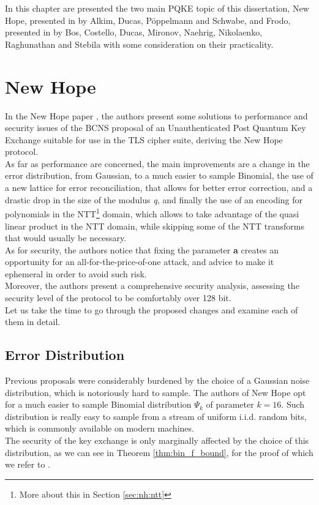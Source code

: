 In this chapter are presented the two main PQKE topic of this dissertation, New Hope, presented in \cite{newhope} by Alkim, Ducas, P{\"o}ppelmann and Schwabe, and Frodo, presented in \cite{frodo} by Bos, Costello, Ducas, Mironov, Naehrig, Nikolaenko, Raghunathan and Stebila with some consideration on their practicality.

\section{New Hope}
In the New Hope paper \cite{newhope}, the authors present some solutions to performance and security issues of the BCNS proposal \cite{BCNS} of an Unauthenticated Post Quantum Key Exchange suitable for use in the TLS cipher suite, deriving the New Hope protocol. \\
As far as performance are concerned, the main improvements are a change in the error distribution, from Gaussian, to a much easier to sample Binomial, the use of a new lattice for error reconciliation, that allows for better error correction, and a drastic drop in the size of the modulus \textit{q}, and finally the use of an encoding for polynomials in the NTT\footnote{More about this in Section \ref{sec:nh:ntt}} domain, which allows to take advantage of the quasi linear product in the NTT domain, while skipping some of the NTT transforms that would usually be necessary.\\
As for security, the authors notice that fixing the parameter \textbf{a} creates an opportunity for an all-for-the-price-of-one attack, and advice to make it ephemeral in order to avoid such risk.\\
Moreover, the authors present a comprehensive security analysis, assessing the security level of the protocol to be comfortably over 128 bit.\\
Let us take the time to go through the proposed changes and examine each of them in detail.

\subsection{Error Distribution}
Previous proposals were considerably burdened by the choice of a Gaussian noise distribution, which is notoriously hard to sample. The authors of New Hope opt for a much easier to sample Binomial distribution $\Psi_k$ of parameter $k=16$. Such distribution is really easy to sample from a stream of uniform i.i.d. random bits, which is commonly available on modern machines. \\
The security of the key exchange is only marginally affected by the choice of this distribution, as we can see in Theorem \ref{thm:bin_f_bound}, for the proof of which we refer to \cite{newhope}.

